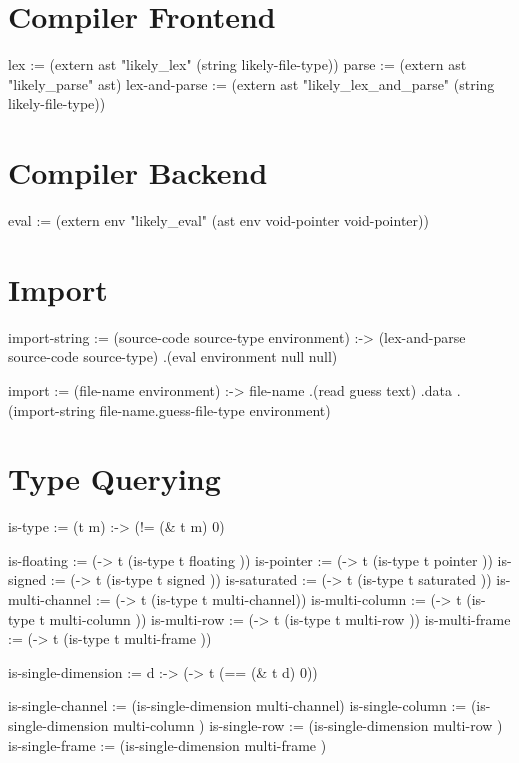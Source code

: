 \documentclass[twoside=false, numbers=noenddot]{scrbook}
\newenvironment{likely}
{ \verbatim }
{ \endverbatim }
\begin{document}
\section{Compiler Frontend}
\begin{likely}
lex   := (extern ast "likely_lex" (string likely-file-type))
parse := (extern ast "likely_parse" ast)
lex-and-parse := (extern ast
                         "likely_lex_and_parse"
                         (string likely-file-type))
\end{likely}

\section{Compiler Backend}
\begin{likely}
eval := (extern env
                "likely_eval"
                (ast env void-pointer void-pointer))
\end{likely}

\section{Import}
\begin{likely}
import-string :=
  (source-code source-type environment) :->
    (lex-and-parse source-code source-type)
   .(eval environment null null)

import :=
  (file-name environment) :->
    file-name
   .(read guess text)
   .data
   .(import-string file-name.guess-file-type environment)
\end{likely}

\section{Type Querying}
\begin{likely}
is-type :=
 (t m) :->
   (!= (& t m) 0)

is-floating      := (-> t (is-type t floating     ))
is-pointer       := (-> t (is-type t pointer      ))
is-signed        := (-> t (is-type t signed       ))
is-saturated     := (-> t (is-type t saturated    ))
is-multi-channel := (-> t (is-type t multi-channel))
is-multi-column  := (-> t (is-type t multi-column ))
is-multi-row     := (-> t (is-type t multi-row    ))
is-multi-frame   := (-> t (is-type t multi-frame  ))

is-single-dimension :=
  d :->
   (-> t (== (& t d) 0))

is-single-channel := (is-single-dimension multi-channel)
is-single-column  := (is-single-dimension multi-column )
is-single-row     := (is-single-dimension multi-row    )
is-single-frame   := (is-single-dimension multi-frame  )
\end{likely}
\end{document}
